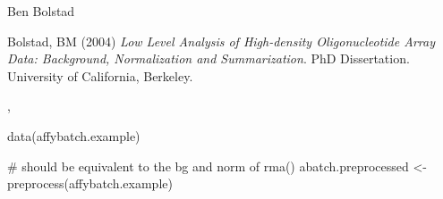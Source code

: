 \begin{Author}\relax
Ben Bolstad 
\end{Author}
\begin{References}\relax
Bolstad, BM (2004) \emph{Low Level Analysis of High-density
Oligonucleotide Array Data: Background, Normalization and
Summarization}. PhD Dissertation. University of California, Berkeley.
\end{References}
\begin{SeeAlso}\relax
{}, 
\end{SeeAlso}
\begin{Examples}
\begin{ExampleCode}
data(affybatch.example)

# should be equivalent to the bg and norm of rma()
abatch.preprocessed <- preprocess(affybatch.example)

\end{ExampleCode}
\end{Examples}

